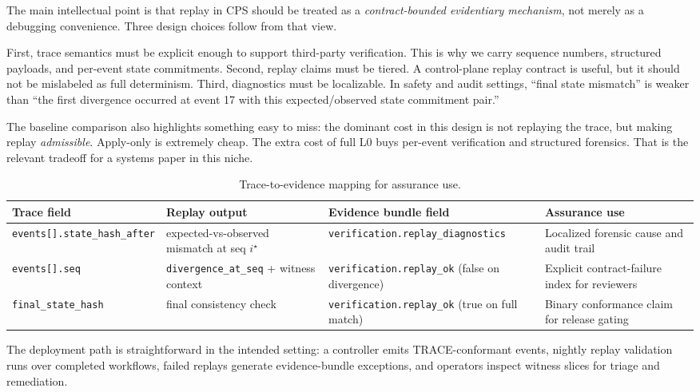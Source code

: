 \documentclass[11pt]{article}
\newcommand{\field}[1]{\texttt{#1}}
\newcommand{\Lzero}{\ensuremath{\mathrm{L0}}}
\begin{document}
The main intellectual point is that replay in CPS should be treated as a \emph{contract-bounded evidentiary mechanism}, not merely as a debugging convenience. Three design choices follow from that view.

First, trace semantics must be explicit enough to support third-party verification. This is why we carry sequence numbers, structured payloads, and per-event state commitments. Second, replay claims must be tiered. A control-plane replay contract is useful, but it should not be mislabeled as full determinism. Third, diagnostics must be localizable. In safety and audit settings, “final state mismatch” is weaker than “the first divergence occurred at event 17 with this expected/observed state commitment pair.”

The baseline comparison also highlights something easy to miss: the dominant cost in this design is not replaying the trace, but making replay \emph{admissible}. Apply-only is extremely cheap. The extra cost of full \Lzero{} buys per-event verification and structured forensics. That is the relevant tradeoff for a systems paper in this niche.

\begin{table}[H]
\centering
\caption{Trace-to-evidence mapping for assurance use.}
\label{tab:evidence-map}
\begin{tabular}{p{2.7cm}p{3.4cm}p{3.4cm}p{3.2cm}}
\toprule
Trace field & Replay output & Evidence bundle field & Assurance use \\
\midrule
\field{events[].state\_hash\_after} & expected-vs-observed mismatch at seq $i^\star$ & \field{verification.replay\_diagnostics} & Localized forensic cause and audit trail \\
\field{events[].seq} & \field{divergence\_at\_seq} + witness context & \field{verification.replay\_ok} (false on divergence) & Explicit contract-failure index for reviewers \\
\field{final\_state\_hash} & final consistency check & \field{verification.replay\_ok} (true on full match) & Binary conformance claim for release gating \\
\bottomrule
\end{tabular}
\end{table}

The deployment path is straightforward in the intended setting: a controller emits TRACE-conformant events, nightly replay validation runs over completed workflows, failed replays generate evidence-bundle exceptions, and operators inspect witness slices for triage and remediation.
\end{document}
